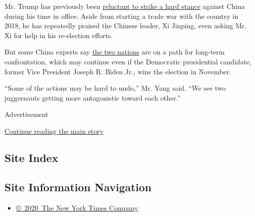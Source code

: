 Mr. Trump has previously been
\href{https://www.nytimes3xbfgragh.onion/2020/06/17/us/politics/bolton-book-trump-impeached.html}{reluctant
to strike a hard stance} against China during his time in office. Aside
from starting a trade war with the country in 2018, he has repeatedly
praised the Chinese leader, Xi Jinping, even asking Mr. Xi for help in
his re-election efforts.

But some China experts say
\href{https://www.nytimes3xbfgragh.onion/2020/07/25/world/asia/us-china-trump-xi.html}{the
two nations} are on a path for long-term confrontation, which may
continue even if the Democratic presidential candidate, former Vice
President Joseph R. Biden Jr., wins the election in November.

``Some of the actions may be hard to undo,'' Mr. Yang said. ``We see two
juggernauts getting more antagonistic toward each other.''

Advertisement

\protect\hyperlink{after-bottom}{Continue reading the main story}

\hypertarget{site-index}{%
\subsection{Site Index}\label{site-index}}

\hypertarget{site-information-navigation}{%
\subsection{Site Information
Navigation}\label{site-information-navigation}}

\begin{itemize}
\tightlist
\item
  \href{https://help.nytimes3xbfgragh.onion/hc/en-us/articles/115014792127-Copyright-notice}{©~2020~The
  New York Times Company}
\end{itemize}

